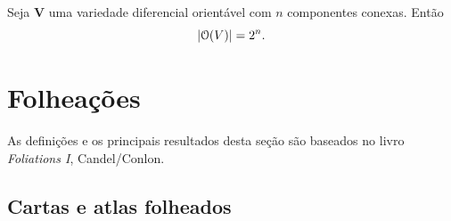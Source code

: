 \begin{proposition}
Seja $\bm V$ uma variedade diferencial orientável com $n$ componentes conexas. Então
	\begin{equation*}
	\left\lvert{\mathcal{O}(V)}\right\rvert = 2^n.
	\end{equation*}
\end{proposition}

\section{Folheações}

As definições e os principais resultados desta seção são baseados no livro \textit{Foliations I}, Candel/Conlon.

\subsection{Cartas e atlas folheados}

